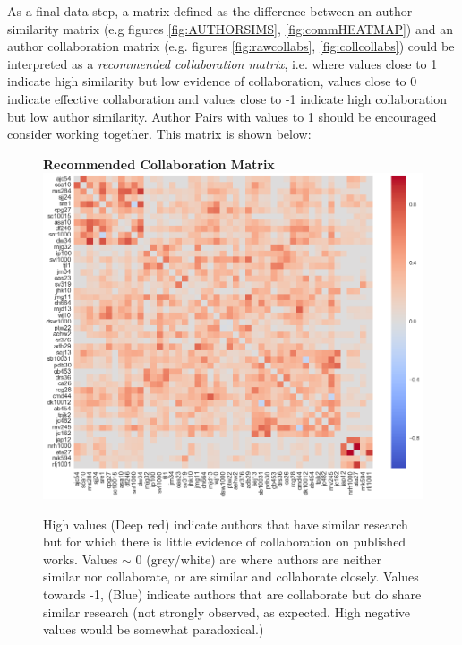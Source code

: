 As a final data step, a matrix defined as the difference between an author similarity matrix (e.g figures \ref{fig:AUTHORSIMS}, \ref{fig:commHEATMAP}) and an author collaboration matrix (e.g. figures \ref{fig:rawcollabs}, \ref{fig:collcollabs}) could be interpreted as a \emph{recommended collaboration matrix}, i.e. where values close to 1 indicate high similarity but low evidence of collaboration, values close to 0 indicate effective collaboration and values close to -1 indicate high collaboration but low author similarity. Author Pairs with values to 1 should be encouraged consider working together. This matrix is shown below:
\begin{center}
\begin{figure}[H]
  \centering
  \textbf{Recommended Collaboration Matrix}
    \includegraphics[width=\textwidth]{Analysis/Recommending_Mat.png}
    \caption[Recommended Collaboration Matrix]{High values (Deep red) indicate authors that have similar research but for which there is little evidence of collaboration on published works. Values $\sim$ 0 (grey/white) are where authors are neither similar nor collaborate, or are similar and collaborate closely. Values towards -1, (Blue) indicate authors that are collaborate but do share similar research (not strongly observed, as expected. High negative values would be somewhat paradoxical.) }
    \label{fig:RECOMM_MAT}

\end{figure} 
\end{center}
